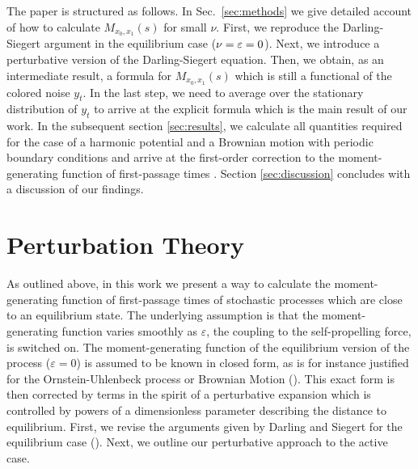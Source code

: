 \documentclass[%
 reprint,
superscriptaddress,
nofootinbib,
 amsmath,amssymb,
 aps,
prx,
]{revtex4-2}
\begin{document}
The paper is structured as follows. In Sec.~\ref{sec:methods} we give detailed account of how to calculate $M_{x_0,x_1}(s)$ for small $\nu$. First, we reproduce the Darling-Siegert argument in the equilibrium case ($\nu = \varepsilon = 0$). Next, we introduce a perturbative version of the Darling-Siegert equation. Then, we obtain, as an intermediate result, a formula for $M_{x_0,x_1}(s)$ which is still a functional of the colored noise $y_t$. In the last step, we need to average over the stationary distribution of $y_t$ to arrive at the explicit formula  which is the main result of our work. In the subsequent section \ref{sec:results}, we calculate all quantities required for the case of a harmonic potential and a Brownian motion with periodic boundary conditions and arrive at the first-order correction to the moment-generating function of first-passage times . Section \ref{sec:discussion} concludes with a discussion of our findings.



\section{\label{sec:methods} Perturbation Theory}


As outlined above, in this work we present a way to calculate the moment-generating function of first-passage times of stochastic processes which are close to an equilibrium state. The underlying assumption is that the moment-generating function varies smoothly as $\varepsilon$, the coupling to the self-propelling force, is switched on. 
The moment-generating function of the  equilibrium version of the process ($\varepsilon = 0$) is assumed to be known in closed form, as is for instance justified for the Ornstein-Uhlenbeck process or Brownian Motion (\cite{bakry_analysis_2013}). This exact form is then corrected by terms in the spirit of a perturbative expansion which is controlled by powers of a dimensionless parameter describing the distance to equilibrium. 
First, we revise the arguments given by Darling and Siegert for the equilibrium case (\cite{siegert_first_1951,darling_first_1953}). Next, we outline our perturbative approach to the active case.
\end{document}
